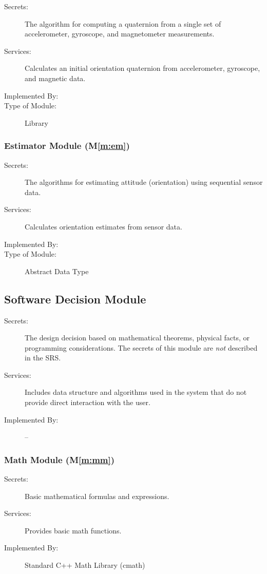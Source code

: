 \documentclass[12pt, titlepage]{article}
\newcommand{\mref}[1]{M\ref{#1}}
\begin{document}
\begin{description}
\item[Secrets:] The algorithm for computing a quaternion from a single set of accelerometer, gyroscope, and magnetometer measurements.
\item[Services:] Calculates an initial orientation quaternion from accelerometer, gyroscope, and magnetic data.
\item[Implemented By:] \progname
\item[Type of Module:] Library
\end{description}

\subsubsection{Estimator Module (\mref{m:em})}

\begin{description}
\item[Secrets:] The algorithms for estimating attitude (orientation) using sequential sensor data.
\item[Services:] Calculates orientation estimates from sensor data.
\item[Implemented By:] \progname
\item[Type of Module:] Abstract Data Type
\end{description}

\subsection{Software Decision Module}

\begin{description}
\item[Secrets:] The design decision based on mathematical theorems, physical facts, or programming
  considerations. The secrets of this module are \emph{not} described in the SRS.
\item[Services:] Includes data structure and algorithms used in the system that do not provide
  direct interaction with the user.
\item[Implemented By:] --
\end{description}

\subsubsection{Math Module (\mref{m:mm})}
\begin{description}
  \item[Secrets:] Basic mathematical formulas and expressions.
  \item[Services:] Provides basic math functions.
  \item[Implemented By:] Standard C++ Math Library (cmath)
\end{description}
\end{document}
